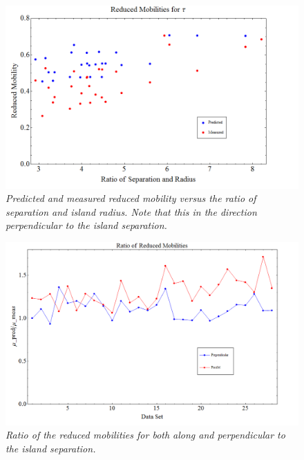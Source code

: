 \documentclass[11pt]{article}
\begin{document}
\begin{figure}
\centering
\includegraphics[scale=0.4]{Images/RedMobtau.png}
\caption{\textit{Predicted and measured reduced mobility versus the ratio of separation and island radius. Note that this in the direction perpendicular to the island separation.}}
\label{RedMobtau}
\end{figure}

\begin{figure}
\centering
\includegraphics[scale=0.4]{Images/Ratio.png}
\caption{\textit{Ratio of the reduced mobilities for both along and perpendicular to the island separation.}}
\label{ratio}
\end{figure}
\end{document}
